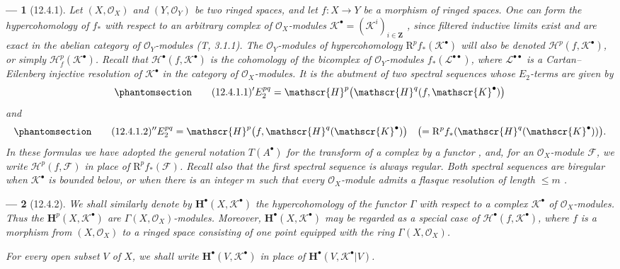 \documentclass[oneside]{amsart}
\theoremstyle{ega-env-style}
\newtheorem*{env}{---}
\theoremstyle{ega-thm-env-style}
\theoremstyle{ega-defn-env-style}
\def\mathcal{\mathscr}
\def\sh{\mathcal}                   %
\def\bb{\mathbf}                    %
\def\leq{\leqslant}                 %
\def\RR{\mathrm{R}}                 %
\newcommand{\oldpage}[2][]{{\marginnote{\normalfont{\textbf{#1}~|~#2}}}\ignorespaces}
\let\EGAOriginalLabel\label
\renewcommand{\label}[1]{\phantomsection\EGAOriginalLabel{#1}}
\begin{document}
\begin{env}[12.4.1]
\label{0.12.4.1}
Let $(X,\sh{O}_X)$ and $(Y,\sh{O}_Y)$ be two ringed spaces, and let
$f:X\longrightarrow Y$ be a morphism of ringed spaces.
One can form the hypercohomology of $f_*$ with respect to an arbitrary
complex of $\sh{O}_X$-modules
$\sh{K}^\bullet=(\sh{K}^i)_{i\in\bb{Z}}$
, since filtered inductive limits exist and are exact in
the abelian category of $\sh{O}_Y$-modules (T, 3.1.1).
The $\sh{O}_Y$-modules of hypercohomology
$\RR^p f_*(\sh{K}^\bullet)$ will also be denoted
$\sh{H}^p(f,\sh{K}^\bullet)$, or simply
$\sh{H}^p_f(\sh{K}^\bullet)$.
Recall that $\sh{H}^\bullet(f,\sh{K}^\bullet)$ is the cohomology of
the bicomplex of $\sh{O}_Y$-modules $f_*(\sh{L}^{\bullet\bullet})$,
where $\sh{L}^{\bullet\bullet}$ is a Cartan--Eilenberg injective
resolution of $\sh{K}^\bullet$ in the category of
$\sh{O}_X$-modules.
It is the abutment of two spectral sequences whose $E_2$-terms are
given by
\begin{equation}
\label{0.12.4.1.1}
\tag{12.4.1.1}
  {}'E_2^{pq}
  =\sh{H}^p\bigl(\sh{H}^q(f,\sh{K}^\bullet)\bigr)
\end{equation}
and
\begin{equation}
\label{0.12.4.1.2}
\tag{12.4.1.2}
  {}''E_2^{pq}
  =\sh{H}^p\bigl(f,\sh{H}^q(\sh{K}^\bullet)\bigr)
  \quad
  \bigl(=\RR^p f_*(\sh{H}^q(\sh{K}^\bullet))\bigr).
\end{equation}
In these formulas we have adopted the general notation $T(A^\bullet)$
for the transform of a complex by a functor , and, for
an $\sh{O}_X$-module $\sh{F}$, we write
$\sh{H}^p(f,\sh{F})$ in place of $\RR^p f_*(\sh{F})$.
Recall also that the first spectral sequence is always regular.
Both spectral sequences are biregular when $\sh{K}^\bullet$ is
bounded below,
\oldpage[0\textsubscript{III}]{63}
or when there is an integer $m$ such that every $\sh{O}_X$-module
admits a flasque resolution of length $\leq m$ .
\end{env}

\begin{env}[12.4.2]
\label{0.12.4.2}
We shall similarly denote by $\bb{H}^\bullet(X,\sh{K}^\bullet)$ the
hypercohomology of the functor $\Gamma$ with respect to a complex
$\sh{K}^\bullet$ of $\sh{O}_X$-modules.
Thus the $\bb{H}^p(X,\sh{K}^\bullet)$ are
$\Gamma(X,\sh{O}_X)$-modules.
Moreover, $\bb{H}^\bullet(X,\sh{K}^\bullet)$ may be regarded as a
special case of $\sh{H}^\bullet(f,\sh{K}^\bullet)$, where $f$ is a
morphism from $(X,\sh{O}_X)$ to a ringed space consisting of one point
equipped with the ring $\Gamma(X,\sh{O}_X)$.

For every open subset $V$ of $X$, we shall write
$\bb{H}^\bullet(V,\sh{K}^\bullet)$ in place of
$\bb{H}^\bullet(V,\sh{K}^\bullet|V)$.
\end{env}
\end{document}
